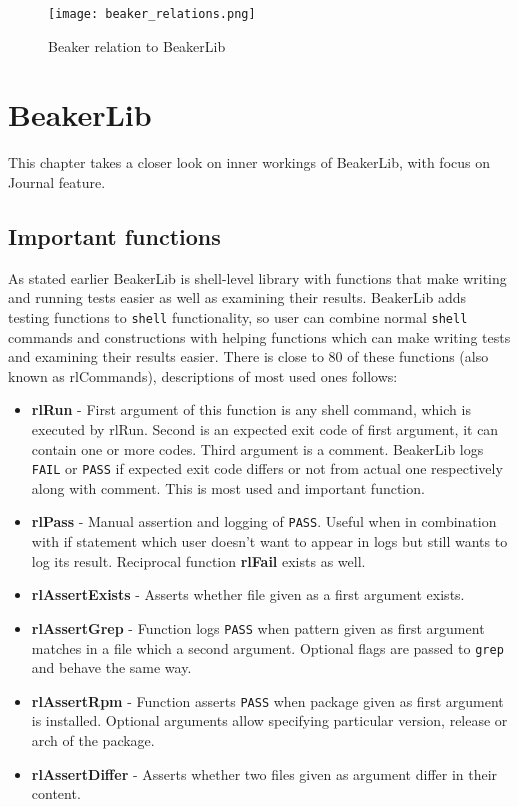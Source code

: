 \begin{figure}[h!]
  \texttt{[image: beaker\_relations.png]}
  \caption{Beaker relation to BeakerLib}
  \label{fig:beaker_relation}
\end{figure}




\chapter{BeakerLib}
This chapter takes a closer look on inner workings of BeakerLib, with focus on Journal feature.

\section{Important functions}
As stated earlier BeakerLib is shell-level library with functions that make writing and running tests easier as well as examining their results.
BeakerLib adds testing functions to \texttt{shell} functionality, so user can combine normal \texttt{shell} commands and constructions with helping functions which can make writing tests and examining their results easier. There is close to 80 of these functions (also known as rlCommands), descriptions of most used ones follows:
\begin{itemize}
\item \textbf{rlRun} - First argument of this function is any shell command, which is executed by rlRun. Second is an expected exit code of first argument, it can contain one or more codes. Third argument is a comment. BeakerLib logs \texttt{FAIL} or \texttt{PASS} if expected exit code differs or not from actual one respectively along with comment. This is most used and important function.
\item \textbf{rlPass} - Manual assertion and logging of \texttt{PASS}. Useful when in combination with if statement which user doesn't want to appear in logs but still wants to log its result. Reciprocal function \textbf{rlFail} exists as well.
\item \textbf{rlAssertExists} - Asserts whether file given as a first argument exists.
\item \textbf{rlAssertGrep} - Function logs \texttt{PASS} when pattern given as first argument matches in a file which a second argument. Optional flags are passed to \texttt{grep} and behave the same way.
\item \textbf{rlAssertRpm} - Function asserts \texttt{PASS} when package given as first argument is installed.  Optional arguments allow specifying particular version, release or arch of the package.
\item \textbf{rlAssertDiffer} - Asserts whether two files given as argument differ in their content. 
\end{itemize}

